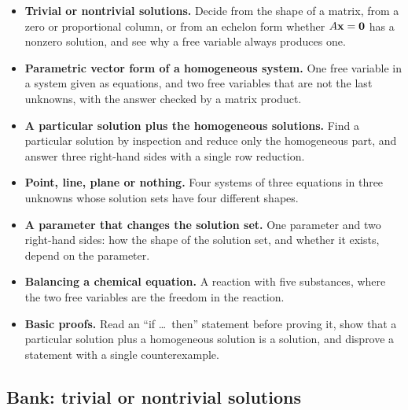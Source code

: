 \documentclass[11pt]{article}
\begin{document}
\begin{remark}
\begin{itemize}
  \item \textbf{Trivial or nontrivial solutions.} Decide from the shape of a matrix, from a zero or proportional column, or from an echelon form whether $A\mathbf{x}=\mathbf{0}$ has a nonzero solution, and see why a free variable always produces one.
  \item \textbf{Parametric vector form of a homogeneous system.} One free variable in a system given as equations, and two free variables that are not the last unknowns, with the answer checked by a matrix product.
  \item \textbf{A particular solution plus the homogeneous solutions.} Find a particular solution by inspection and reduce only the homogeneous part, and answer three right-hand sides with a single row reduction.
  \item \textbf{Point, line, plane or nothing.} Four systems of three equations in three unknowns whose solution sets have four different shapes.
  \item \textbf{A parameter that changes the solution set.} One parameter and two right-hand sides: how the shape of the solution set, and whether it exists, depend on the parameter.
  \item \textbf{Balancing a chemical equation.} A reaction with five substances, where the two free variables are the freedom in the reaction.
  \item \textbf{Basic proofs.} Read an ``if \dots\ then'' statement before proving it, show that a particular solution plus a homogeneous solution is a solution, and disprove a statement with a single counterexample.
\end{itemize}
\end{remark}

\subsection*{Bank: trivial or nontrivial solutions}
\end{document}
